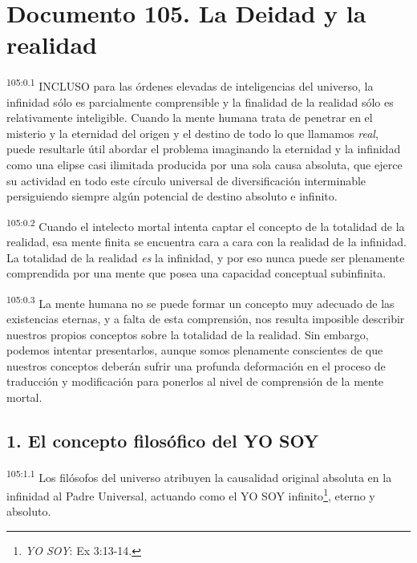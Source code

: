 \chapter{Documento 105. La Deidad y la realidad}
\par
\textsuperscript{105:0.1} INCLUSO para las órdenes elevadas de inteligencias del universo, la infinidad sólo es parcialmente comprensible y la finalidad de la realidad sólo es relativamente inteligible. Cuando la mente humana trata de penetrar en el misterio y la eternidad del origen y el destino de todo lo que llamamos \textit{real}, puede resultarle útil abordar el problema imaginando la eternidad y la infinidad como una elipse casi ilimitada producida por una sola causa absoluta, que ejerce su actividad en todo este círculo universal de diversificación interminable persiguiendo siempre algún potencial de destino absoluto e infinito.

\par
\textsuperscript{105:0.2} Cuando el intelecto mortal intenta captar el concepto de la totalidad de la realidad, esa mente finita se encuentra cara a cara con la realidad de la infinidad. La totalidad de la realidad \textit{es} la infinidad, y por eso nunca puede ser plenamente comprendida por una mente que posea una capacidad conceptual subinfinita.

\par
\textsuperscript{105:0.3} La mente humana no se puede formar un concepto muy adecuado de las existencias eternas, y a falta de esta comprensión, nos resulta imposible describir nuestros propios conceptos sobre la totalidad de la realidad. Sin embargo, podemos intentar presentarlos, aunque somos plenamente conscientes de que nuestros conceptos deberán sufrir una profunda deformación en el proceso de traducción y modificación para ponerlos al nivel de comprensión de la mente mortal.

\section*{1. El concepto filosófico del YO SOY}
\par
\textsuperscript{105:1.1} Los filósofos del universo atribuyen la causalidad original absoluta en la infinidad al Padre Universal, actuando como el YO SOY infinito\footnote{\textit{YO SOY}: Ex 3:13-14.}, eterno y absoluto.

